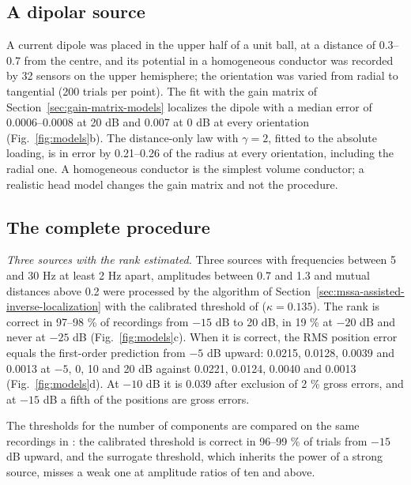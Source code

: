\documentclass{article}
\begin{document}
\subsection{A dipolar source}\label{sec:a-dipolar-source}

A current dipole was placed in the upper half of a unit ball, at a distance of 0.3--0.7 from the centre, and its potential in a homogeneous conductor was recorded by 32 sensors on the upper hemisphere; the orientation was varied from radial to tangential (200 trials per point). The fit with the gain matrix of Section~\ref{sec:gain-matrix-models} localizes the dipole with a median error of 0.0006--0.0008 at 20 dB and 0.007 at 0 dB at every orientation (Fig.~\ref{fig:models}b). The distance-only law with $\gamma = 2$, fitted to the absolute loading, is in error by 0.21--0.26 of the radius at every orientation, including the radial one. A homogeneous conductor is the simplest volume conductor; a realistic head model changes the gain matrix and not the procedure.

\subsection{The complete procedure}\label{sec:the-complete-procedure}

\emph{Three sources with the rank estimated.} Three sources with frequencies between 5 and 30 Hz at least 2 Hz apart, amplitudes between 0.7 and 1.3 and mutual distances above 0.2 were processed by the algorithm of Section~\ref{sec:mssa-assisted-inverse-localization} with the calibrated threshold of \cite{ref-companionA} ($\kappa = 0.135$). The rank is correct in 97--98 \% of recordings from $-15$ dB to 20 dB, in 19 \% at $-20$ dB and never at $-25$ dB (Fig.~\ref{fig:models}c). When it is correct, the RMS position error equals the first-order prediction from $-5$ dB upward: 0.0215, 0.0128, 0.0039 and 0.0013 at $-5$, 0, 10 and 20 dB against 0.0221, 0.0124, 0.0040 and 0.0013 (Fig.~\ref{fig:models}d). At $-10$ dB it is 0.039 after exclusion of 2 \% gross errors, and at $-15$ dB a fifth of the positions are gross errors.

The thresholds for the number of components are compared on the same recordings in \cite{ref-companionA}: the calibrated threshold is correct in 96--99 \% of trials from $-15$ dB upward, and the surrogate threshold, which inherits the power of a strong source, misses a weak one at amplitude ratios of ten and above.
\end{document}
